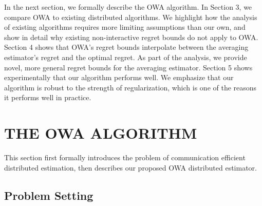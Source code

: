 \documentclass[twoside]{article}
\DeclareMathOperator*{\argmax}{arg\,max}
\newcommand{\Y}{\mathcal{Y}}
\newcommand{\X}{\mathcal{X}}
\newcommand{\x}{\mathbf{x}}
\newcommand{\w}{\theta}
\newcommand{\wmle}{\hat\w^{erm}}
\newcommand{\loss}{\ell}
\newcommand{\trans}[1]{\ensuremath{{#1}^{\mathsf{T}}}}
\begin{document}
In the next section, we formally describe the OWA algorithm.
In Section 3, we compare OWA to existing distributed algorithms.
We highlight how the analysis of existing algorithms requires more limiting assumptions than our own,
and show in detail why existing non-interactive regret bounds do not apply to OWA.
Section 4 shows that OWA's regret bounds interpolate between the averaging estimator's regret and the optimal regret.
As part of the analysis, we provide novel, more general regret bounds for the averaging estimator.
Section 5 shows experimentally that our algorithm performs well.
We emphasize that our algorithm is robust to the strength of regularization,
which is one of the reasons it performs well in practice.

\section{THE OWA ALGORITHM}


This section first formally introduces the problem of communication efficient distributed estimation,
then describes our proposed OWA distributed estimator.

\subsection{Problem Setting}
\end{document}
